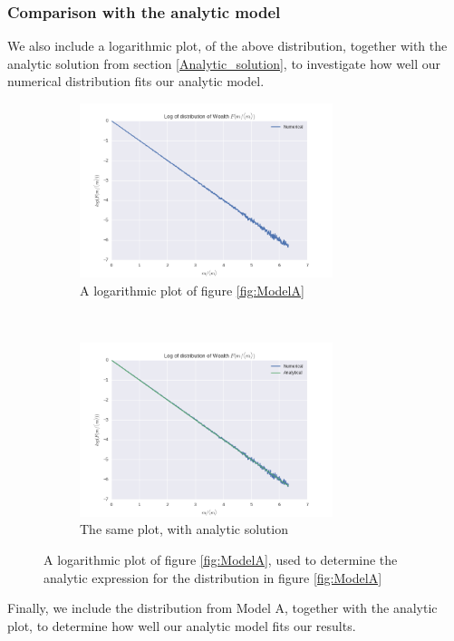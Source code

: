 \documentclass[a4paper, 10pt]{article}
\begin{document}
\subsubsection{Comparison with the analytic model}
We also include a logarithmic plot, of the above distribution, together with the analytic solution from section \ref{Analytic_solution}, to investigate how well our numerical distribution fits our analytic model.
\begin{figure}[!ht]
    \centering
    \begin{subfigure}[H!]{0.5\textwidth}
        \centering
        \includegraphics[height=2.0in]{logDistLamb0.png}
        \caption{A logarithmic plot of figure \ref{fig:ModelA}}\label{fig:ModelA_log_raw}
    \end{subfigure}%
    ~ 
    \begin{subfigure}[H!]{0.5\textwidth}
        \centering
        \includegraphics[height=2.0in]{logDistLamb0WAnalyt.png}
        \caption{The same plot, with analytic solution}\label{fig:ModelA_log_fit}
    \end{subfigure}
    \caption{A logarithmic plot of figure \ref{fig:ModelA}, used to determine the analytic expression for the distribution in figure \ref{fig:ModelA}}\label{fig:ModelA__log}
\end{figure}
Finally, we include the distribution from Model A, together with the analytic plot, to determine how well our analytic model fits our results.
\end{document}
